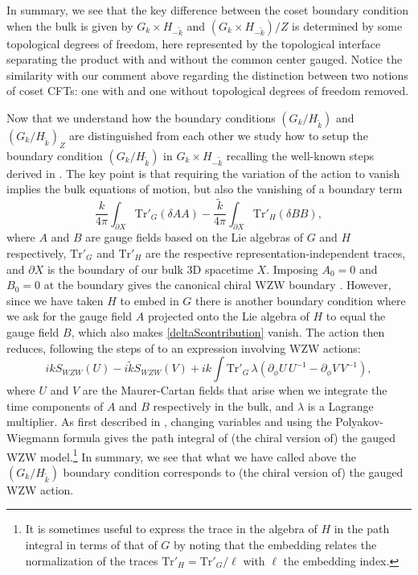 \documentclass[11pt]{article}
\numberwithin{equation}{section}
\begin{document}
In summary, we see that the key difference between the coset boundary condition when the bulk is given by $G_{k} \times H_{-\tilde{k}}$ and $(G_{k} \times H_{-\tilde{k}})/Z$ is determined by some topological degrees of freedom, here represented by the topological interface separating the product with and without the common center gauged. Notice the similarity with our comment above regarding the distinction between two notions of coset CFTs: one with and one without topological degrees of freedom removed. 




Now that we understand how the boundary conditions $(G_{k} / H_{\tilde{k}})$ and $(G_{k} / H_{\tilde{k}})_{Z}$ are distinguished from each other we study how to setup the boundary condition $(G_{k}/H_{\tilde{k}})$ in $G_{k} \times H_{-\tilde{k}}$ recalling the well-known steps derived in \cite{Elitzur:1989nr,Moore:1989yh}.  The key point is that requiring the variation of the action to vanish implies the bulk equations of motion, but also the vanishing of a boundary term
\begin{equation} \label{deltaScontribution}
    \frac{k}{4\pi}\int_{\partial X} \mathrm{Tr}'_{G}(\delta A A) - \frac{\tilde{k}}{4\pi}\int_{\partial X} \mathrm{Tr}'_{H}(\delta B B),
\end{equation}
where $A$ and $B$ are gauge fields based on the Lie algebras of $G$ and $H$ respectively, $\mathrm{Tr}'_{G}$ and $\mathrm{Tr}'_{H}$ are the respective representation-independent traces, and  $\partial X$ is the boundary of our bulk 3D spacetime $X$. Imposing $A_{0} = 0$ and $B_{0} = 0 $ at the boundary gives the canonical chiral WZW boundary \cite{Elitzur:1989nr}. However, since we have taken $H$ to embed in $G$ there is another boundary condition where we ask for the gauge field $A$ projected onto the Lie algebra of $H$ to equal the gauge field $B$, which also makes \eqref{deltaScontribution} vanish. The action then reduces, following the steps of \cite{Elitzur:1989nr,Moore:1989yh} to an expression involving WZW actions:
\begin{equation}
    i k S_{WZW}(U) - i \tilde{k} S_{WZW}(V) + ik \int \mathrm{Tr}'_{G} \, \lambda (\partial_{\phi}U \, U^{-1} - \partial_{\phi} V \, V^{-1}),
\end{equation}
where $U$ and $V$ are the Maurer-Cartan fields that arise when we integrate the time components of $A$ and $B$ respectively in the bulk, and $\lambda$ is a Lagrange multiplier. As first described in \cite{Moore:1989yh}, changing variables and using the Polyakov-Wiegmann formula  gives the path integral of (the chiral version of) the gauged WZW model.\footnote{It is sometimes useful to express the trace in the algebra of $H$ in the path integral in terms of that of $G$ by noting that the embedding relates the normalization of the traces $\mathrm{Tr}'_{H} = \mathrm{Tr}'_{G}/\ell$ with $\ell$ the embedding index.} In summary, we see that what we have called above the $(G_{k}/H_{\tilde{k}})$ boundary condition corresponds to (the chiral version of) the gauged WZW action.
\end{document}
